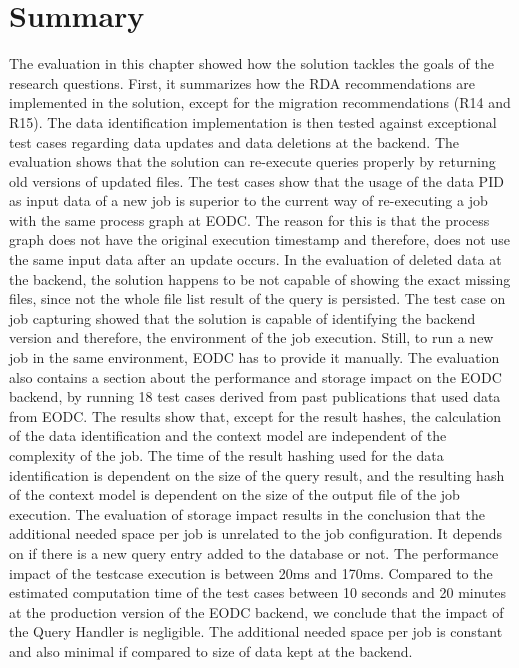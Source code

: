 \documentclass[draft,final]{vutinfth} %
\begin{document}
\section{Summary}
The evaluation in this chapter showed how the solution tackles the goals of the research questions. First, it summarizes how the RDA recommendations are implemented in the solution, except for the migration recommendations (R14 and R15). The data identification implementation is then tested against exceptional test cases regarding data updates and data deletions at the backend. The evaluation shows that the solution can re-execute queries properly by returning old versions of updated files. The test cases show that the usage of the data PID as input data of a new job is superior to the current way of re-executing a job with the same process graph at EODC.
The reason for this is that the process graph does not have the original execution timestamp and therefore, does not use the same input data after an update occurs. In the evaluation of deleted data at the backend, the solution happens to be not capable of showing the exact missing files, since not the whole file list result of the query is persisted. The test case on job capturing showed that the solution is capable of identifying the backend version and therefore, the environment of the job execution. Still, to run a new job in the same environment, EODC has to provide it manually. The evaluation also contains a section about the performance and storage impact on the EODC backend, by running 18 test cases derived from past publications that used data from EODC. The results show that, except for the result hashes, the calculation of the data identification and the context model are independent of the complexity of the job. The time of the result hashing used for the data identification is dependent on the size of the query result, and the resulting hash of the context model is dependent on the size of the output file of the job execution. The evaluation of storage impact results in the conclusion that the additional needed space per job is unrelated to the job configuration. It depends on if there is a new query entry added to the database or not. The performance impact of the testcase execution is between 20ms and 170ms. Compared to the estimated computation time of the test cases between 10 seconds and 20 minutes at the production version of the EODC backend, we conclude that the impact of the Query Handler is negligible. The additional needed space per job is constant and also minimal if compared to size of data kept at the backend.
   
\end{document}
